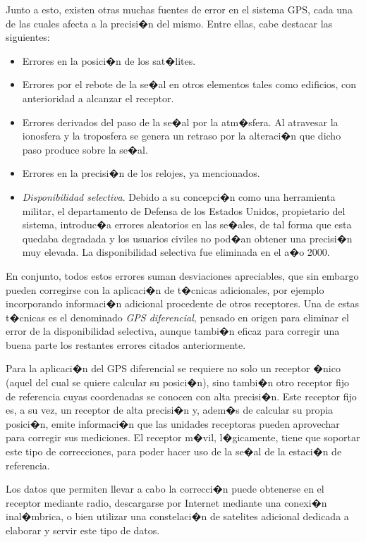 Junto a esto, existen otras muchas fuentes de error en el sistema GPS, cada una de las cuales afecta a la precisi�n del mismo. Entre ellas, cabe destacar las siguientes:

\begin{itemize}
	\item Errores en la posici�n de los sat�lites.
	\item Errores por el rebote de la se�al en otros elementos tales como edificios, con anterioridad a alcanzar el receptor.
	\item Errores derivados del paso de la se�al por la atm�sfera. Al atravesar la ionosfera y la troposfera se genera un retraso por la alteraci�n que dicho paso produce sobre la se�al.
	\item Errores en la precisi�n de los relojes, ya mencionados.
	\item \emph{Disponibilidad selectiva}. Debido a su concepci�n como una herramienta militar, el departamento de Defensa de los Estados Unidos, propietario del sistema, introduc�a errores aleatorios en las se�ales, de tal forma que esta quedaba degradada y los usuarios civiles no pod�an obtener una precisi�n muy elevada. La disponibilidad selectiva fue eliminada en el a�o 2000.
\end{itemize}


En conjunto, todos estos errores suman desviaciones apreciables, que sin embargo pueden corregirse con la aplicaci�n de t�cnicas adicionales, por ejemplo incorporando informaci�n adicional procedente de otros receptores. Una de estas t�cnicas es el denominado \emph{GPS diferencial}, pensado en origen para eliminar el error de la disponibilidad selectiva, aunque tambi�n eficaz para corregir una buena parte los restantes errores citados anteriormente.

Para la aplicaci�n del GPS diferencial se requiere no solo un receptor �nico (aquel del cual se quiere calcular su posici�n), sino tambi�n otro receptor fijo de referencia cuyas coordenadas se conocen con alta precisi�n. Este receptor fijo es, a su vez, un receptor de alta precisi�n y, adem�s de calcular su propia posici�n, emite informaci�n que las unidades receptoras pueden aprovechar para corregir sus mediciones. El receptor m�vil, l�gicamente, tiene que soportar este tipo de correcciones, para poder hacer uso de la se�al de la estaci�n de referencia.

Los datos que permiten llevar a cabo la correcci�n puede obtenerse en el receptor mediante radio, descargarse por Internet mediante una conexi�n inal�mbrica, o bien utilizar una constelaci�n de satelites adicional dedicada a elaborar y servir este tipo de datos.

